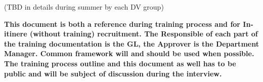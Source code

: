 \documentclass[graybox]{svmult}
\begin{document}
(TBD in details during summer by each DV group)

\begin{svgraybox}
\large{\textbf{This document is both a reference during training process and for In-itinere (without training) recruitment.
The Responsible of each part of the training documentation is the GL, the Approver is the Department Manager. Common framework will and should be used when possible. The training process outline and this document as well has to be public and will be subject of discussion during the interview.}}
\end{svgraybox}

%
\end{document}

